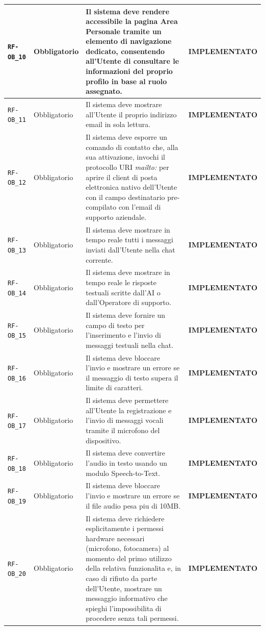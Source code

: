 \documentclass[a4paper, 11pt, oneside]{scrartcl}
\begin{document}
\begin{longtable}{|>{\raggedright\arraybackslash}p{}|>{\raggedright\arraybackslash}p{}|>{\raggedright\arraybackslash}p{}|>{\raggedright\arraybackslash}p{}|}
    \hline
    \texttt{RF-OB\_10} & Obbligatorio & Il sistema deve rendere accessibile la pagina Area Personale tramite un elemento di navigazione dedicato, consentendo all'Utente di consultare le informazioni del proprio profilo in base al ruolo assegnato. & \textbf{IMPLEMENTATO} \\
    \hline
    \texttt{RF-OB\_11} & Obbligatorio & Il sistema deve mostrare all'Utente il proprio indirizzo email in sola lettura. & \textbf{IMPLEMENTATO} \\
    \hline
    \texttt{RF-OB\_12} & Obbligatorio & Il sistema deve esporre un comando di contatto che, alla sua attivazione, invochi il protocollo URI \textit{mailto:} per aprire il client di posta elettronica nativo dell'Utente con il campo destinatario pre-compilato con l'email di supporto aziendale. & \textbf{IMPLEMENTATO} \\
    \hline
    \texttt{RF-OB\_13} & Obbligatorio & Il sistema deve mostrare in tempo reale tutti i messaggi inviati dall'Utente nella chat corrente. & \textbf{IMPLEMENTATO} \\
    \hline
    \texttt{RF-OB\_14} & Obbligatorio & Il sistema deve mostrare in tempo reale le risposte testuali scritte dall'AI o dall'Operatore di supporto. & \textbf{IMPLEMENTATO} \\
    \hline
    \texttt{RF-OB\_15} & Obbligatorio & Il sistema deve fornire un campo di testo per l'inserimento e l'invio di messaggi testuali nella chat. & \textbf{IMPLEMENTATO} \\
    \hline
    \texttt{RF-OB\_16} & Obbligatorio & Il sistema deve bloccare l'invio e mostrare un errore se il messaggio di testo supera il limite di caratteri. & \textbf{IMPLEMENTATO} \\
    \hline
    \texttt{RF-OB\_17} & Obbligatorio & Il sistema deve permettere all'Utente la registrazione e l'invio di messaggi vocali tramite il microfono del dispositivo. & \textbf{IMPLEMENTATO} \\
    \hline
    \texttt{RF-OB\_18} & Obbligatorio & Il sistema deve convertire l'audio in testo usando un modulo Speech-to-Text. & \textbf{IMPLEMENTATO} \\
    \hline
    \texttt{RF-OB\_19} & Obbligatorio & Il sistema deve bloccare l'invio e mostrare un errore se il file audio pesa piu di 10MB. & \textbf{IMPLEMENTATO} \\
    \hline
    \texttt{RF-OB\_20} & Obbligatorio & Il sistema deve richiedere esplicitamente i permessi hardware necessari (microfono, fotocamera) al momento del primo utilizzo della relativa funzionalita e, in caso di rifiuto da parte dell'Utente, mostrare un messaggio informativo che spieghi l'impossibilita di procedere senza tali permessi. & \textbf{IMPLEMENTATO} \\

\end{longtable}
\end{document}
